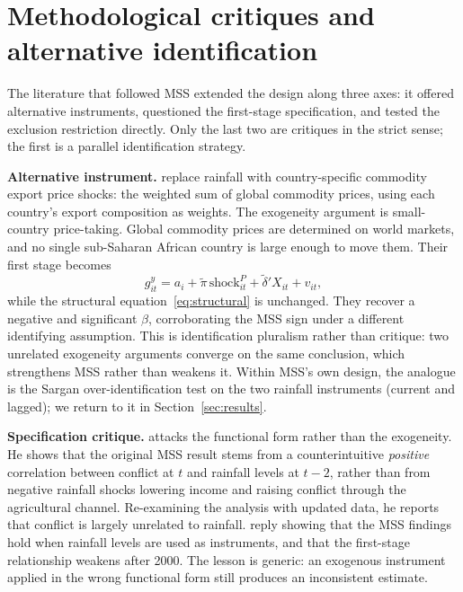 \documentclass[11pt,a4paper]{article}
\begin{document}
\section{Methodological critiques and alternative identification}\label{sec:critiques}
The literature that followed MSS extended the design along three axes:
it offered alternative instruments, questioned the first-stage
specification, and tested the exclusion restriction directly. Only the
last two are critiques in the strict sense; the first is a parallel
identification strategy.

\textbf{Alternative instrument.} \citet{BrucknerCiccone2010} replace
rainfall with country-specific commodity export price shocks: the
weighted sum of global commodity prices, using each country's export
composition as weights. The exogeneity argument is small-country
price-taking. Global commodity prices are determined on world markets,
and no single sub-Saharan African country is large enough to move them.
Their first stage becomes
\begin{equation}
g^{y}_{it} = a_i + \tilde\pi\, \text{shock}^{P}_{it}
             + \tilde\delta' X_{it} + v_{it},
\label{eq:bc-fs}
\end{equation}
while the structural equation~\eqref{eq:structural} is unchanged. They
recover a negative and significant $\beta$, corroborating the MSS sign
under a different identifying assumption. This is identification
pluralism rather than critique: two unrelated exogeneity arguments
converge on the same conclusion, which strengthens MSS rather than
weakens it. Within MSS's own design, the analogue is the Sargan
over-identification test on the two rainfall instruments
(current and lagged); we return to it in Section~\ref{sec:results}.

\textbf{Specification critique.} \citet{Ciccone2011} attacks the
functional form rather than the exogeneity. He shows that the original
MSS result stems from a counterintuitive \emph{positive} correlation
between conflict at $t$ and rainfall levels at $t-2$, rather than from
negative rainfall shocks lowering income and raising conflict through
the agricultural channel. Re-examining the analysis with updated data,
he reports that conflict is largely unrelated to rainfall.
\citet{MiguelSatyanath2011} reply showing that the MSS findings hold
when rainfall levels are used as instruments, and that the first-stage
relationship weakens after 2000. The lesson is generic: an exogenous
instrument applied in the wrong functional form still produces an
inconsistent estimate.
\end{document}

